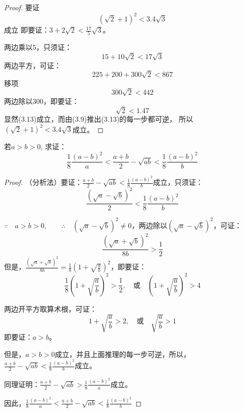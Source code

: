 \begin{proof}
要证
\begin{equation}
    \left(\sqrt{2}+1\right)^2 <3.4\sqrt{3}
\end{equation}
成立 即要证：$3+2\sqrt{2}<\frac{17}{5}\sqrt{3}$。

两边乘以5，只须证：
\begin{equation}
    15+10\sqrt{2}<17\sqrt{3}
\end{equation}
两边平方，可证：
\begin{equation}
    225+200+300\sqrt{2}<867
\end{equation}
移项
\begin{equation}
    300\sqrt{2}<442
\end{equation}
两边除以300，即要证：
\begin{equation}
    \sqrt{2}<1.47
\end{equation}
显然(3.13)成立，而由(3.9)推出(3.13)的每一步都可逆，
所以$\left(\sqrt{2}+1\right)^2 <3.4\sqrt{3}$成立。
\end{proof}
    
\begin{example}
    若$a>b>0$, 求证：
    \[\frac{1}{8}\frac{(a-b)^2}{a}<\frac{a+b}{2}-\sqrt{ab}<\frac{1}{8}\frac{(a-b)^2}{b} \]
\end{example}

\begin{proof}
    （分析法）要证：$\frac{a+b}{2}-\sqrt{ab}<\frac{1}{8}\frac{(a-b)^2}{b}$成立，只须证：
\[\frac{\left(\sqrt{a}-\sqrt{b}\right)^2}{2}<\frac{1}{8}\frac{(a-b)^2}{b}\]

$\because \quad a>b>0,\qquad \therefore\quad \left(\sqrt{a}-\sqrt{b}\right)^2\ne 0$，两边除以$\left(\sqrt{a}-\sqrt{b}\right)^2$，可证：
\[\frac{\left(\sqrt{a}+\sqrt{b}\right)^2}{8b}>\frac{1}{2}\]
但是，$\frac{\left(\sqrt{a}+\sqrt{b}\right)^2}{8b}=\frac{1}{8}\left(1+\sqrt{\frac{a}{b}}\right)^2$，即要证：
\[\frac{1}{8}\left(1+\sqrt{\frac{a}{b}}\right)^2>\frac{1}{2},\quad \text{或}\quad \left(1+\sqrt{\frac{a}{b}}\right)^2>4\]

两边开平方取算术根，可证：
\[1+\sqrt{\frac{a}{b}}>2,\quad \text{或}\quad \sqrt{\frac{a}{b}}>1\]
即要证：$a>b$。

但是，$a>b>0$成立，并且上面推理的每一步可逆，所以，
$\frac{a+b}{2}-\sqrt{ab}<\frac{1}{8}\frac{(a-b)^2}{b}$成立。

同理证明：$\frac{a+b}{2}-\sqrt{ab}>\frac{1}{8}\frac{(a-b)^2}{a}$成立。

因此，$\frac{1}{8}\frac{(a-b)^2}{a}<\frac{a+b}{2}-\sqrt{ab}<\frac{1}{8}\frac{(a-b)^2}{b}$
\end{proof}

